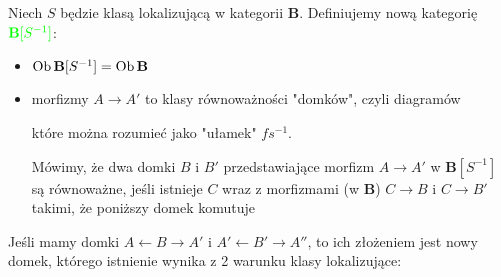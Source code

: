 \begin{definition}[domki]
  Niech $S$ będzie klasą lokalizującą w kategorii $\mathbf{B}$. Definiujemy nową kategorię $\color{green}\mathbf{B}[S^{-1}]$:
  \begin{itemize}
    \item $\operatorname{Ob} \mathbf{B}[S^{-1}]=\operatorname{Ob} \mathbf{B}$
    \item morfizmy $A\to A'$ to klasy równoważności "domków", czyli diagramów
      \begin{center}\end{center}
      które można rozumieć jako "ułamek" $fs^{-1}$.

      Mówimy, że dwa domki $B$ i $B'$ przedstawiające morfizm $A\to A'$ w $\mathbf{B}[S^{-1}]$ są równoważne, jeśli istnieje $C$ wraz z morfizmami (w $\mathbf{B}$) $C\to B$ i $C\to B'$ takimi, że poniższy domek komutuje
      \begin{center}\end{center}
  \end{itemize}
\end{definition}

Jeśli mamy domki $A\leftarrow B\to A'$ i $A' \leftarrow B'\to A''$, to ich złożeniem jest nowy domek, którego istnienie wynika z 2 warunku klasy lokalizujące:
\begin{center}\end{center}


